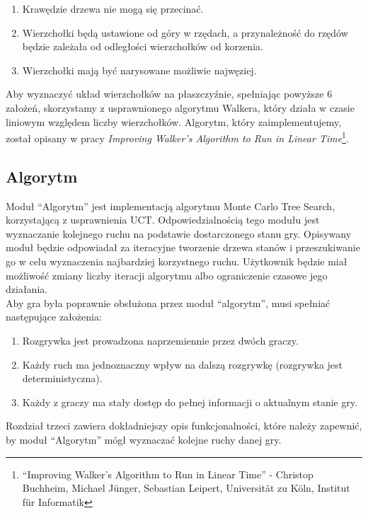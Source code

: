 \documentclass{article}
\begin{document}
	\begin{enumerate}
		\item Krawędzie drzewa nie mogą się przecinać.
		\item Wierzchołki będą ustawione od góry w rzędach, a przynależność do
		rzędów będzie zależała od odległości wierzchołków od korzenia.
		\item Wierzchołki mają być narysowane możliwie najwęziej.  \\
	\end{enumerate}

	\noindent Aby wyznaczyć układ wierzchołków na płaszczyźnie, spełniając powyższe 6 założeń, skorzystamy z usprawnionego algorytmu Walkera, który działa w czasie liniowym względem liczby wierzchołków. Algorytm, który zaimplementujemy, został opisany w pracy \textit{Improving Walker's Algorithm to Run in Linear Time}\footnote{``Improving Walker's Algorithm to Run in Linear Time'' - Christop Buchheim, Michael Jünger, Sebastian Leipert, Universität zu Köln, Institut für Informatik}.
	
	\subsection{Algorytm}
	Moduł ``Algorytm'' jest implementacją algorytmu Monte Carlo Tree Search, korzystającą z usprawnienia UCT. Odpowiedzialnością tego modułu jest wyznaczanie kolejnego ruchu na podstawie dostarczonego stanu gry. Opisywany moduł będzie odpowiadał za iteracyjne tworzenie drzewa stanów i przeszukiwanie go w celu wyznaczenia najbardziej korzystnego ruchu. Użytkownik będzie miał możliwość zmiany liczby iteracji algorytmu albo ograniczenie czasowe jego działania. \\
	
	\noindent Aby gra była poprawnie obsłużona przez moduł ``algorytm'', musi spełniać następujące założenia: \\
		
	\begin{enumerate}
		\item Rozgrywka jest prowadzona naprzemiennie przez dwóch graczy.
		\item Każdy ruch ma jednoznaczny wpływ na dalszą rozgrywkę (rozgrywka jest deterministyczna).
		\item Każdy z graczy ma stały dostęp do pełnej informacji o aktualnym stanie gry. \\
	\end{enumerate} 
	
	\noindent Rozdział trzeci zawiera dokładniejszy opis funkcjonalności, które należy zapewnić, by moduł ``Algorytm'' mógł wyznaczać kolejne ruchy danej gry.
	
\end{document}
